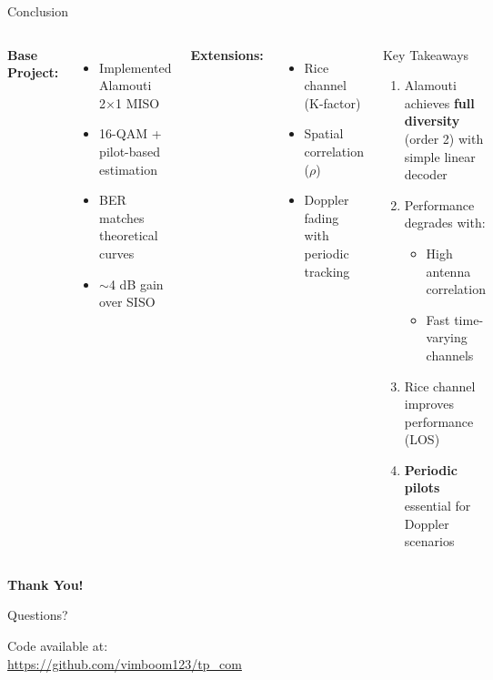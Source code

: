 \documentclass[aspectratio=169]{beamer}
\begin{document}
\begin{frame}{Conclusion}
  \begin{columns}
    \textbf{Base Project:}
    \begin{itemize}
      \item[$\checkmark$] Implemented Alamouti 2×1 MISO
      \item[$\checkmark$] 16-QAM + pilot-based estimation
      \item[$\checkmark$] BER matches theoretical curves
      \item[$\checkmark$] $\sim$4 dB gain over SISO
    \end{itemize}
    
    \vspace{1em}
    \textbf{Extensions:}
    \begin{itemize}
      \item[$\checkmark$] Rice channel (K-factor)
      \item[$\checkmark$] Spatial correlation ($\rho$)
      \item[$\checkmark$] Doppler fading with periodic tracking
    \end{itemize}
    
    \begin{block}{Key Takeaways}
      \begin{enumerate}
        \item Alamouti achieves \textbf{full diversity} (order 2) with simple linear decoder
        \item Performance degrades with:
        \begin{itemize}
          \item High antenna correlation
          \item Fast time-varying channels
        \end{itemize}
        \item Rice channel improves performance (LOS)
        \item \textbf{Periodic pilots} essential for Doppler scenarios
      \end{enumerate}
    \end{block}
  \end{columns}
\end{frame}

\begin{frame}
  \centering
  \Huge \textbf{Thank You!}
  
  \vspace{2em}
  \Large Questions?
  
  \vspace{2em}
  \normalsize
  Code available at:\\
  \url{https://github.com/vimboom123/tp_com}
\end{frame}
\end{document}
